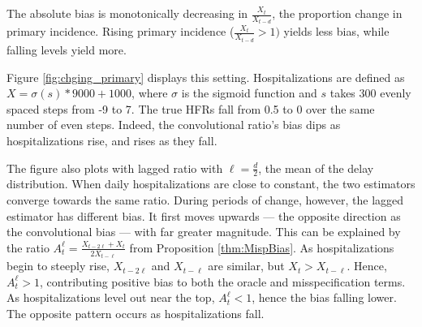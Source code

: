 \documentclass{article}
\begin{document}
The absolute bias is monotonically decreasing in $\frac{X_{t}}{X_{t-d}}$, the proportion change in primary incidence. Rising primary incidence ($\frac{X_{t}}{X_{t-d}}>1)$ yields less bias, while falling levels yield more.

Figure \ref{fig:chging_primary} displays this setting. Hospitalizations are defined as $X = \sigma(s)*9000+1000$, where $\sigma$ is the sigmoid function and $s$ takes 300 evenly spaced steps from -9 to 7. The true HFRs fall from 0.5 to 0 over the same number of even steps. Indeed, the convolutional ratio's bias dips as hospitalizations rise, and rises as they fall. 

The figure also plots with lagged ratio with $\ell=\frac{d}{2}$, the mean of the delay distribution. When daily hospitalizations are close to constant, the two estimators converge towards the same ratio. During periods of change, however, the lagged estimator has different bias. It first moves upwards --- the opposite direction as the convolutional bias --- with far greater magnitude. This can be explained by the ratio $A_t^\ell = \frac{X_{t-2\ell}+X_t}{2X_{t-\ell}}$ from Proposition \ref{thm:MispBias}. As hospitalizations begin to steeply rise, $X_{t-2\ell}$ and $X_{t-\ell}$ are similar, but $X_t > X_{t-\ell}$. Hence, $A_t^\ell>1$, contributing positive bias to both the oracle and misspecification terms. As hospitalizations level out near the top, $A_t^\ell < 1$, hence the bias falling lower. The opposite pattern occurs as hospitalizations fall. 

\end{document}
